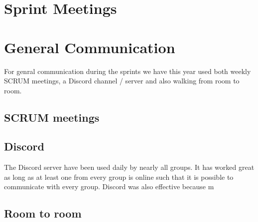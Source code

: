 \section{Sprint Meetings}

\section{General Communication}
For genral communication during the sprints we have this year used both weekly
SCRUM meetings, a Discord channel / server and also walking from room to room.

\subsection{SCRUM meetings}

\subsection{Discord}
The Discord server have been used daily by nearly all groups. It has worked
great as long as at least one from every group is online such that it is
possible to communicate with every group. Discord was also effective because m

\subsection{Room to room}

